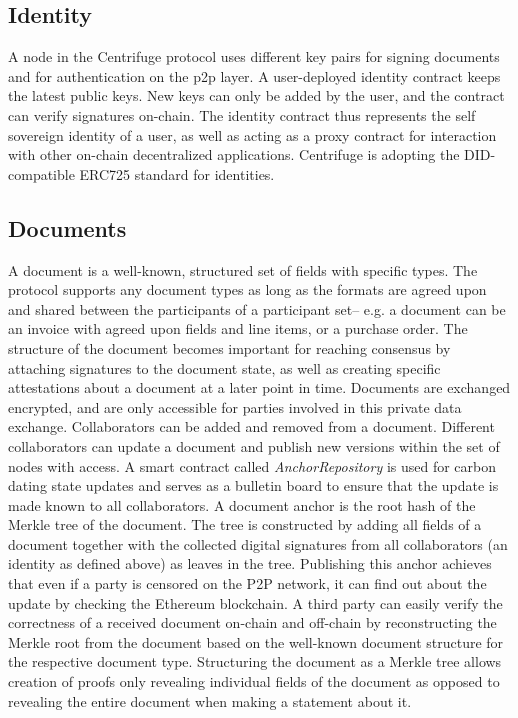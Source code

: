 \subsection{Identity}
A node in the Centrifuge protocol uses different key pairs for signing documents and for authentication on the p2p layer. A user-deployed identity contract keeps the latest public keys. New keys can only be added by the user, and the contract can verify signatures on-chain. The identity contract thus represents the self sovereign identity of a user, as well as acting as a proxy contract for interaction with other on-chain decentralized applications. Centrifuge is adopting the DID-compatible ERC725 standard for identities.

\subsection{Documents}
A document is a well-known, structured set of fields with specific types. The protocol supports any document types as long as the formats are agreed upon and shared between the participants of a participant set-- e.g. a document can be an invoice with agreed upon fields and line items, or a purchase order. The structure of the document becomes important for reaching consensus by attaching signatures to the document state, as well as creating specific attestations about a document at a later point in time. Documents are exchanged encrypted, and are only accessible for parties involved in this private data exchange. Collaborators can be added and removed from a document. Different collaborators can update a document and publish new versions within the set of nodes with access.
A smart contract called \textit{AnchorRepository} is used for carbon dating state updates and serves as a bulletin board\cite{heiberg2018trade} to ensure that the update is made known to all collaborators. A document anchor is the root hash of the Merkle tree of the document. The tree is constructed by adding all fields of a document together with the collected digital signatures from all collaborators (an identity as defined above) as leaves in the tree. Publishing this anchor achieves that even if a party is censored on the P2P network, it can find out about the update by checking the Ethereum blockchain.
A third party can easily verify the correctness of a received document on-chain and off-chain by reconstructing the Merkle root from the document based on the well-known document structure for the respective document type. Structuring the document as a Merkle tree allows creation of proofs only revealing individual fields of the document as opposed to revealing the entire document when making a statement about it.

